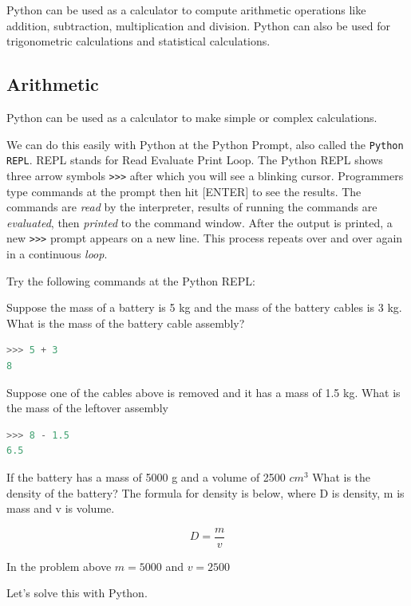 \documentclass{book}
\begin{document}
    
        Python can be used as a calculator to compute arithmetic operations like
addition, subtraction, multiplication and division. Python can also be
used for trigonometric calculations and statistical calculations.
    




    
        \subsection{Arithmetic}\label{arithmetic}

Python can be used as a calculator to make simple or complex
calculations.

We can do this easily with Python at the Python Prompt, also called the
\lstinline!Python REPL!. REPL stands for Read Evaluate Print Loop. The
Python REPL shows three arrow symbols \lstinline!>>>! after which you
will see a blinking cursor. Programmers type commands at the prompt then
hit {[}ENTER{]} to see the results. The commands are \emph{read} by the
interpreter, results of running the commands are \emph{evaluated}, then
\emph{printed} to the command window. After the output is printed, a new
\lstinline!>>>! prompt appears on a new line. This process repeats over
and over again in a continuous \emph{loop}.

Try the following commands at the Python REPL:

Suppose the mass of a battery is 5 kg and the mass of the battery cables
is 3 kg. What is the mass of the battery cable assembly?

\begin{lstlisting}[language=Python]
>>> 5 + 3
8
\end{lstlisting}

Suppose one of the cables above is removed and it has a mass of 1.5 kg.
What is the mass of the leftover assembly

\begin{lstlisting}[language=Python]
>>> 8 - 1.5
6.5
\end{lstlisting}

If the battery has a mass of 5000 g and a volume of 2500 \(cm^3\) What
is the density of the battery? The formula for density is below, where D
is density, m is mass and v is volume.

\[ D = \frac{m}{v} \]

In the problem above \(m = 5000\) and \(v=2500\)

Let's solve this with Python.
\end{document}
